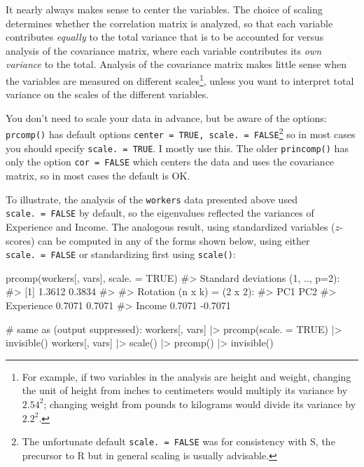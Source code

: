 \documentclass[
  letterpaper,
  10pt,
  krantz2]{krantz}
\makeatletter
\newenvironment{Shaded}{\begin{snugshade}}{\end{snugshade}}
\newcommand{\AttributeTok}[1]{\textcolor[rgb]{0.40,0.45,0.13}{#1}}
\newcommand{\CommentTok}[1]{\textcolor[rgb]{0.37,0.37,0.37}{#1}}
\newcommand{\ConstantTok}[1]{\textcolor[rgb]{0.56,0.35,0.01}{#1}}
\newcommand{\FunctionTok}[1]{\textcolor[rgb]{0.28,0.35,0.67}{#1}}
\newcommand{\NormalTok}[1]{\textcolor[rgb]{0.00,0.23,0.31}{#1}}
\newcommand{\SpecialCharTok}[1]{\textcolor[rgb]{0.37,0.37,0.37}{#1}}
\newenvironment{kframe}{%
  \medskip{}
  \setlength{\fboxsep}{.8em}
  \def\at@end@of@kframe{}%
  \ifinner\ifhmode%
  \def\at@end@of@kframe{\end{minipage}}%
  \begin{minipage}{\columnwidth}%
  \fi\fi%
  \def\FrameCommand##1{\hskip\@totalleftmargin \hskip-\fboxsep
  \colorbox{shadecolor}{##1}\hskip-\fboxsep
      \hskip-\linewidth \hskip-\@totalleftmargin \hskip\columnwidth}%
  \MakeFramed {\advance\hsize-\width
    \@totalleftmargin\z@ \linewidth\hsize
    \@setminipage}}%
{\par\unskip\endMakeFramed%
  \at@end@of@kframe}
\renewenvironment{Shaded}{\begin{kframe}}{\end{kframe}}
\makeatother
\begin{document}
It nearly always makes sense to center the variables. The choice of
scaling determines whether the correlation matrix is analyzed, so that
each variable contributes \emph{equally} to the total variance that is
to be accounted for versus analysis of the covariance matrix, where each
variable contributes its \emph{own variance} to the total. Analysis of
the covariance matrix makes little sense when the variables are measured
on different scales\footnote{For example, if two variables in the
  analysis are height and weight, changing the unit of height from
  inches to centimeters would multiply its variance by \(2.54^2\);
  changing weight from pounds to kilograms would divide its variance by
  \(2.2^2\).}, unless you want to interpret total variance on the scales
of the different variables.

You don't need to scale your data in advance, but be aware of the
options: \texttt{prcomp()} has default options
\texttt{center\ =\ TRUE,\ scale.\ =\ FALSE}\footnote{The unfortunate
  default \texttt{scale.\ =\ FALSE} was for consistency with S, the
  precursor to R but in general scaling is usually advisable.} so in
most cases you should specify \texttt{scale.\ =\ TRUE}. I mostly use
this. The older \texttt{princomp()} has only the option
\texttt{cor\ =\ FALSE} which centers the data and uses the covariance
matrix, so in most cases the default is OK.

To illustrate, the analysis of the \texttt{workers} data presented above
used \texttt{scale.\ =\ FALSE} by default, so the eigenvalues reflected
the variances of Experience and Income. The analogous result, using
standardized variables (\(z\)-scores) can be computed in any of the
forms shown below, using either \texttt{scale.\ =\ FALSE} or
standardizing first using \texttt{scale()}:

\begin{Shaded}
\begin{Highlighting}[]
\FunctionTok{prcomp}\NormalTok{(workers[, vars], }\AttributeTok{scale. =} \ConstantTok{TRUE}\NormalTok{)}
\CommentTok{\#\textgreater{} Standard deviations (1, .., p=2):}
\CommentTok{\#\textgreater{} [1] 1.3612 0.3834}
\CommentTok{\#\textgreater{} }
\CommentTok{\#\textgreater{} Rotation (n x k) = (2 x 2):}
\CommentTok{\#\textgreater{}               PC1     PC2}
\CommentTok{\#\textgreater{} Experience 0.7071  0.7071}
\CommentTok{\#\textgreater{} Income     0.7071 {-}0.7071}

\CommentTok{\# same as (output suppressed):}
\NormalTok{workers[, vars] }\SpecialCharTok{|\textgreater{}} \FunctionTok{prcomp}\NormalTok{(}\AttributeTok{scale. =} \ConstantTok{TRUE}\NormalTok{) }\SpecialCharTok{|\textgreater{}} \FunctionTok{invisible}\NormalTok{()}
\NormalTok{workers[, vars] }\SpecialCharTok{|\textgreater{}} \FunctionTok{scale}\NormalTok{() }\SpecialCharTok{|\textgreater{}} \FunctionTok{prcomp}\NormalTok{() }\SpecialCharTok{|\textgreater{}} \FunctionTok{invisible}\NormalTok{()}
\end{Highlighting}
\end{Shaded}
\end{document}
